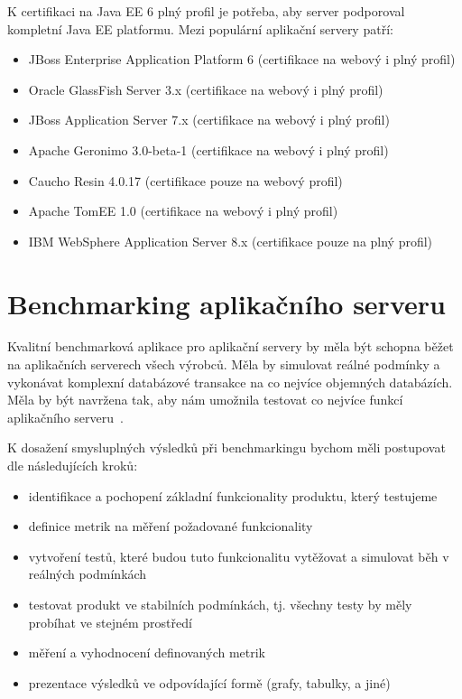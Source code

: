 \documentclass[122pt,oneside]{fithesis}
\begin{document}
K certifikaci na Java EE 6 plný profil je potřeba, aby server podporoval kompletní Java EE platformu.
Mezi populární aplikační servery patří:
\begin{itemize}
  \item JBoss Enterprise Application Platform 6 (certifikace na webový i plný profil)
  \item Oracle GlassFish Server 3.x (certifikace na webový i plný profil)
  \item JBoss Application Server 7.x (certifikace na webový i plný profil)
  \item Apache Geronimo 3.0-beta-1 (certifikace na webový i plný profil)
  \item Caucho Resin 4.0.17 (certifikace pouze na webový profil)
  \item Apache TomEE 1.0 (certifikace na webový i plný profil)
  \item IBM WebSphere Application Server 8.x (certifikace pouze na plný profil)
\end{itemize}

\section{Benchmarking aplikačního serveru}
Kvalitní benchmarková aplikace pro aplikační servery by měla být schopna běžet na aplikačních serverech všech výrobců. Měla by simulovat reálné podmínky a vykonávat komplexní databázové transakce na co nejvíce objemných databázích. Měla by být navržena tak, aby nám umožnila testovat co nejvíce funkcí aplikačního serveru~\cite{sybase}. 

K dosažení smysluplných výsledků při benchmarkingu bychom měli postupovat dle následujících kroků:
\begin{itemize}
  \item identifikace a pochopení základní funkcionality produktu, který testujeme
  \item definice metrik na měření požadované funkcionality
  \item vytvoření testů, které budou tuto funkcionalitu vytěžovat a simulovat běh v reálných podmínkách
  \item testovat produkt ve stabilních podmínkách, tj. všechny testy by měly probíhat ve stejném prostředí
  \item měření a vyhodnocení definovaných metrik
  \item prezentace výsledků ve odpovídající formě (grafy, tabulky, a jiné)
\end{itemize}
\end{document}
